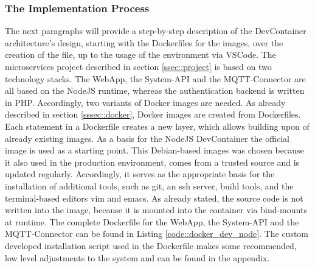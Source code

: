         \subsubsection{The Implementation Process}\label{ssec::imp_process}
        The next paragraphs will provide a step-by-step description of the DevContainer architecture's design, starting with the Dockerfiles for the images, over the creation of the  file, up to the usage of the environment via \ac{VSCode}.
        The microservices project described in section \ref{ssec::project} is based on two technology stacks. The WebApp, the System-\ac{API} and the MQTT-Connector are all based on the NodeJS runtime, whereas the authentication backend is written in PHP. Accordingly, two variants of Docker images are needed. As already described in section \ref{sssec::docker}, Docker images are created from Dockerfiles. Each statement in a Dockerfile creates a new layer, which allows building upon of already existing images.\newline
        As a basis for the NodeJS DevContainer the official  image is used as a starting point. This Debian-based images was chosen because it also used in the production environment, comes from a trusted source and is updated regularly. Accordingly, it serves as the appropriate basis for the installation of additional tools, such as git, an ssh server, build tools, and the terminal-based editors vim and emacs. As already stated, the source code is not written into the image, because it is mounted into the container via bind-mounts at runtime. The complete Dockerfile for the WebApp, the System-\ac{API} and the MQTT-Connector can be found in Listing \ref{code::docker_dev_node}. The custom developed installation script used in the Dockerfile makes some recommended, low level adjustments to the system and can be found in the appendix.\newline
        

